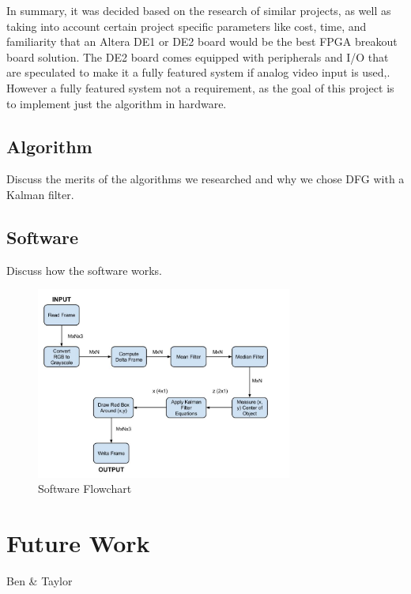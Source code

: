\documentclass[12pt]{article} %
\begin{document}
In summary, it was decided based on the research of similar projects, as well as taking into account certain project specific parameters like cost, time, and familiarity that an Altera DE1 or DE2 board would be the best FPGA breakout board solution. The DE2 board comes equipped with peripherals and I/O that are speculated to make it a fully featured system if analog video input is used,. However a fully featured system not a requirement, as the goal of this project is to implement just the algorithm in hardware.
\subsection{Algorithm}
Discuss the merits of the algorithms we researched and why we chose DFG with a Kalman filter.
\subsection{Software}
Discuss how the software works.
\begin{figure}[h]
\centering
\includegraphics[width=0.75\textwidth]{./images/software_flow.jpg}
\caption{Software Flowchart}
\label{fig:sw_flow}    
\end{figure}
\section{Future Work}
Ben \& Taylor
\end{document}
